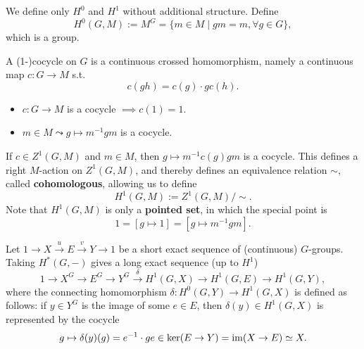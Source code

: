 We define only $H^0$ and $H^1$ without additional structure.
Define \[H^0(G, M) := M^G = \{m\in M\mid gm = m,\forall g\in G\},\]
which is a group.

A (1-)cocycle on $G$ is a continuous crossed homomorphism, namely a continuous map $c : G\to M$ s.t. \[c(gh) = c(g)\cdot gc(h).\]
\begin{itemize}
\item $c : G\to M$ is a cocycle $\implies c(1) = 1$.
\item $m\in M\leadsto g\mapsto m^{-1}gm$ is a cocycle.
\end{itemize}
If $c\in Z^1(G,M)$ and $m\in M$,
then $g\mapsto m^{-1}c(g)gm$ is a cocycle.
This defines a right $M$-action on $Z^1(G, M)$,
and thereby defines an equivalence relation $\sim$, called \textbf{cohomologous}, allowing us to define \[H^1(G, M) := Z^1(G, M)/\!\sim.\]
Note that $H^1(G, M)$ is only a \textbf{pointed set},
in which the special point is \[1 = [g\mapsto 1] = [g\mapsto m^{-1}gm].\]

Let $1\to X\stackrel{u }{\to} E\stackrel{v}{\to} Y\to 1$ be a short exact sequence of (continuous) $G$-groups.
Taking $H^*(G, -)$ gives a long exact sequence (up to $H^1$)
\[1\to X^G\to E^G\to Y^G\stackrel{\delta}{\to} H^1(G, X)\to H^1(G, E)\to H^1(G, Y),\]
where the connecting homomorphism $\delta : H^0(G, Y)\to H^1(G, X)$ is defined as follows:
if $y\in Y^G$ is the image of some $e\in E$,
then $\delta(y)\in H^1(G, X)$ is represented by the cocycle
\[g\mapsto \delta(y)(g) = e^{-1}\cdot ge\in\ker(E\to Y) = \operatorname{im}(X\to E) \simeq X.\]

